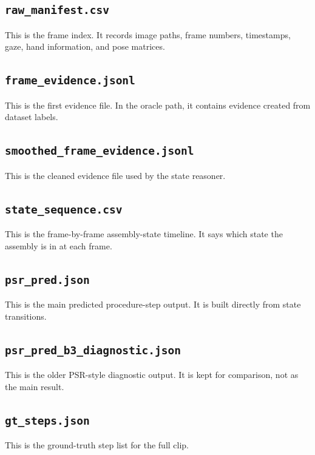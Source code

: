 \documentclass[11pt,a4paper]{article}
\begin{document}
\subsection{\texttt{raw\_manifest.csv}}

This is the frame index. It records image paths, frame numbers, timestamps, gaze, hand information, and pose matrices.

\subsection{\texttt{frame\_evidence.jsonl}}

This is the first evidence file. In the oracle path, it contains evidence created from dataset labels.

\subsection{\texttt{smoothed\_frame\_evidence.jsonl}}

This is the cleaned evidence file used by the state reasoner.

\subsection{\texttt{state\_sequence.csv}}

This is the frame-by-frame assembly-state timeline. It says which state the assembly is in at each frame.

\subsection{\texttt{psr\_pred.json}}

This is the main predicted procedure-step output. It is built directly from state transitions.

\subsection{\texttt{psr\_pred\_b3\_diagnostic.json}}

This is the older PSR-style diagnostic output. It is kept for comparison, not as the main result.

\subsection{\texttt{gt\_steps.json}}

This is the ground-truth step list for the full clip.
\end{document}
